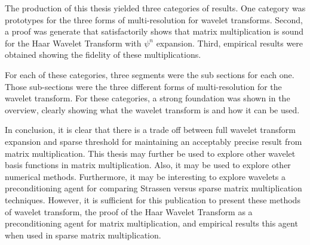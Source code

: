 

The production of this thesis yielded three categories of results.  One category was prototypes for the three forms of multi-resolution for wavelet transforms.  Second, a proof was generate that satisfactorily shows that matrix multiplication is sound for the Haar Wavelet Transform with $\psi^n$ expansion.  Third,   empirical results were obtained showing the fidelity of these multiplications.  

For each of these categories, three segments were the sub sections for each one.  Those sub-sections were the three different forms of multi-resolution for the wavelet transform.  For these categories, a strong foundation was shown in the overview, clearly showing what the wavelet transform is and how it can be used.  

In conclusion, it is clear that there is a trade off between full wavelet transform expansion and sparse threshold for maintaining an acceptably precise result from matrix multiplication.  This thesis may further be used to explore other wavelet basis functions in matrix multiplication.  Also, it may be used to explore other numerical methods.   Furthermore, it may be interesting to explore wavelets a preconditioning agent for comparing Strassen versus sparse matrix multiplication techniques.  However, it is sufficient for this publication to present these methods of wavelet transform, the proof of the Haar Wavelet Transform as a preconditioning agent for matrix multiplication, and empirical results this agent when used in sparse matrix multiplication.  